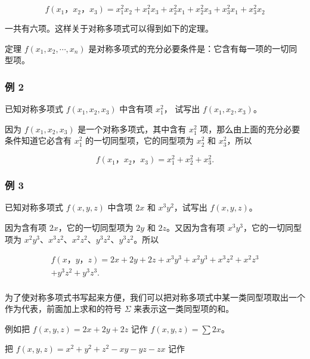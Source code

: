 \[
f \left(x _ {1}\text{，} x _ {2}\text{，} x _ {3}\right) = x _ {1} ^ {2} x _ {2} + x _ {1} ^ {2} x _ {3} + x _ {2} ^ {2} x _ {1} + x _ {2} ^ {2} x _ {3} + x _ {3} ^ {2} x _ {1} + x _ {3} ^ {2} x _ {2}
\]

一共有六项。这样关于对称多项式可以得到如下的定理。

定理 \(f(x_{1}, x_{2}, \cdots, x_{n})\) 是对称多项式的充分必要条件是：它含有每一项的一切同型项。

\subsubsection{例 2}

已知对称多项式 \(f(x_{1}, x_{2}, x_{3})\) 中含有项 \(x_{1}^{2}\)，
试写出 \(f(x_{1}, x_{2}, x_{3})\)。

 因为 \(f(x_{1}, x_{2}, x_{3})\)
是一个对称多项式，其中含有 \(x_{1}^{2}\)
项，那么由上面的充分必要条件知道它必含有 \(x_{1}^{2}\)
的一切同型项，它的同型项为 \(x_{2}^{2}\) 和 \(x_{3}^{2}\)，所以

\[
f (x _ {1}\text{，} x _ {2}\text{，} x _ {3}) = x _ {1} ^ {2} + x _ {2} ^ {2} + x _ {3} ^ {2}.
\]

\subsubsection{例 3}

已知对称多项式 \(f(x, y, z)\) 中含项 \(2x\) 和 \(x^3 y^2\)，试写出
\(f(x, y, z)\)。

 因为含有项 \(2x\)，它的一切同型项为 \(2y\) 和
\(2z\)。又因为含有项 \(x^3 y^3\)，它的一切同型项为
\(x^2 y^3\)、\(x^3 z^2\)、\(x^2 z^2\)、\(y^3 z^2\)、\(y^3 z^2\)。所以

\[
\begin{array}{l} f (x\text{，} y\text{，} z) = 2 x + 2 y + 2 z + x ^ {3} y ^ {3} + x ^ {2} y ^ {3} + x ^ {3} z ^ {2} + x ^ {2} z ^ {3} \\ + y ^ {3} z ^ {2} + y ^ {3} z ^ {3}. \\ \end{array}
\]

为了使对称多项式书写起来方便，我们可以把对称多项式中某一类同型项取出一个作为代表，前面加上求和的符号
\(\Sigma\) 来表示这一类同型项的和。

例如把 \(f(x, y, z) = 2x + 2y + 2z\) 记作 \(f(x, y, z) = \sum 2x\)。

把 \(f(x, y, z) = x^2 + y^2 + z^2 - xy - yz - zx\) 记作

